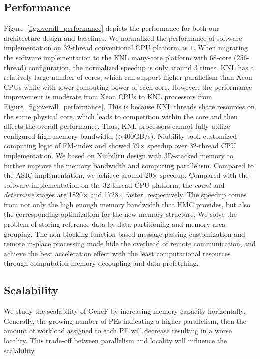 \documentclass[9pt,conference]{IEEEtran}
\begin{document}
\subsection{Performance}
Figure~\ref{fig:overall_performance} depicts the performance for both our architecture design and baselines. We normalized the performance of software implementation on 32-thread conventional CPU platform as $1$. When migrating the software implementation to the KNL many-core platform with 68-core (256-thread) configuration, the normalized speedup is only around 3 times. KNL has a relatively large number of cores, which can support higher parallelism than Xeon CPUs while with lower computing power of each core. However, the performance improvement is moderate from Xeon CPUs to KNL processors from Figure~\ref{fig:overall_performance}. This is because KNL threads share resources on the same physical core, which leads to competition within the core and then affects the overall performance. Thus, KNL processors cannot fully utilize configured high memory bandwidth (>400GB/s). Niubility took customized computing logic of FM-index and showed 79$\times$ speedup over 32-thread CPU implementation. We based on Niubilitu design with 3D-stacked memory to further improve the memory bandwidth and computing parallelism. Compared to the ASIC implementation, we achieve around 20$\times$ speedup. Compared with the software implementation on the 32-thread CPU platform, the \textit{count} and \textit{determine} stages are 1820$\times$ and 1728$\times$ faster, respectively. The speedup comes from not only the high enough memory bandwidth that HMC provides, but also the corresponding optimization for the new memory structure. We solve the problem of storing reference data by data partitioning and memory area grouping. The non-blocking function-based message passing customization and remote in-place processing mode hide the overhead of remote communication, and achieve the best acceleration effect with the least computational resources through computation-memory decoupling and data prefetching.

\subsection{Scalability}
We study the scalability of GeneF by increasing memory capacity horizontally. Generally, the growing number of PEs indicating a higher parallelism, then the amount of workload assigned to each PE will decrease resulting in a worse locality. This trade-off between parallelism and locality will influence the scalability.
\end{document}
